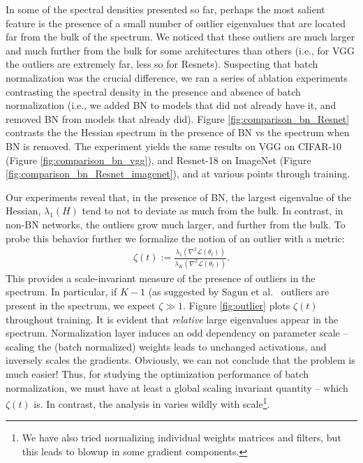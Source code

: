 \documentclass{article}
\newcommand{\loss}{\mathcal{L}}
\begin{document}
In some of the spectral densities presented so far, perhaps the most salient feature is the presence of a small number of outlier eigenvalues that are located far from the bulk of the spectrum. We noticed that these outliers are much larger and much further from the bulk for some architectures than others (i.e., for VGG the outliers are extremely far, less so for Resnets). Suspecting that batch normalization was the crucial difference, we ran a series of ablation experiments contrasting the spectral density in the presence and absence of batch normalization (i.e., we added BN to models that did not already have it, and removed BN from models that already did). Figure \ref{fig:comparison_bn_Resnet} contrasts the the Hessian spectrum in the presence of BN vs the spectrum when BN is removed. The experiment yields the same results on VGG  on CIFAR-10 (Figure \ref{fig:comparison_bn_vgg}), and Resnet-18 on ImageNet (Figure \ref{fig:comparison_bn_Resnet_imagenet}), and at various points through training.

Our experiments reveal that, in the presence of BN, the largest eigenvalue of the Hessian, $\lambda_1(H)$ tend to not to deviate as much from the bulk. In contrast, in non-BN networks, the outliers grow much larger, and further from the bulk. To probe this behavior further we formalize the notion of an outlier with a metric:
\begin{align*}
\zeta(t) := \frac{\lambda_1(\nabla^2 \loss (\theta_t))}{\lambda_{K}(\nabla^2 \loss (\theta_t))}.
\end{align*}
This provides a scale-invariant measure of the presence of outliers in the spectrum. In particular, if $K - 1$ (as suggested by Sagun et al.\ \cite{sagun2016eigenvalues,sagun2017empirical} outliers are present in the spectrum, we expect $\zeta \gg 1$. Figure \ref{fig:outlier} plots $\zeta(t)$ throughout training. It is evident that \emph{relative} large eigenvalues appear in the spectrum. Normalization layer induces an odd dependency on parameter scale -- scaling the (batch normalized) weights leads to unchanged activations, and inversely scales the gradients. Obviously, we can not conclude that the problem is much easier! Thus, for studying the optimization performance of batch normalization, we must have at least a global scaling invariant quantity -- which $\zeta(t)$ is. In contrast, the analysis in \cite{santurkar2018does} varies wildly with scale\footnote{We have also tried normalizing individual weights matrices and filters, but this leads to blowup in some gradient components.}.
\end{document}
